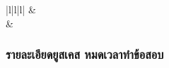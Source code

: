 \begin{table}[H]
\begin{tabular}{|l|l|l|}
                       & \\[-\rowheight]
  \printcelltop                                     & \\
  \hline
  \end{tabular}
  \caption{รายละเอียดยูสเคส ส่งข้อสอบให้ทางบริษัท}
  \label{Table:sendExamToCompany}
\end{table}

\subsubsection{รายละเอียดยูสเคส หมดเวลาทำข้อสอบ}

